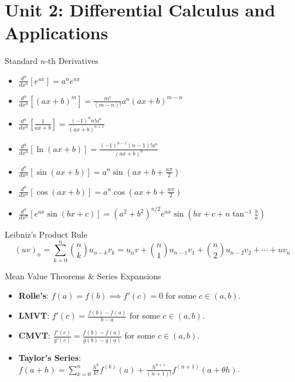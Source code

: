 \chapter{Unit 2: Differential Calculus and Applications}

\begin{formulabox}{Standard $n$-th Derivatives}
\begin{itemize}[leftmargin=1.5em]
    \item $\frac{d^n}{dx^n}[e^{ax}] = a^n e^{ax}$
    \item $\frac{d^n}{dx^n}[(ax+b)^m] = \frac{m!}{(m-n)!} a^n (ax+b)^{m-n}$
    \item $\frac{d^n}{dx^n}\left[\frac{1}{ax+b}\right] = \frac{(-1)^n n! a^n}{(ax+b)^{n+1}}$
    \item $\frac{d^n}{dx^n}[\ln(ax+b)] = \frac{(-1)^{n-1} (n-1)! a^n}{(ax+b)^n}$
    \item $\frac{d^n}{dx^n}[\sin(ax+b)] = a^n \sin\left(ax+b + \frac{n\pi}{2}\right)$
    \item $\frac{d^n}{dx^n}[\cos(ax+b)] = a^n \cos\left(ax+b + \frac{n\pi}{2}\right)$
    \item $\frac{d^n}{dx^n}[e^{ax}\sin(bx+c)] = (a^2+b^2)^{n/2} e^{ax}\sin\left(bx+c + n\tan^{-1}\frac{b}{a}\right)$
\end{itemize}
\end{formulabox}

\begin{formulabox}{Leibniz's Product Rule}
\begin{equation}
(uv)_n = \sum_{k=0}^n \binom{n}{k} u_{n-k} v_k = u_n v + \binom{n}{1} u_{n-1} v_1 + \binom{n}{2} u_{n-2} v_2 + \cdots + u v_n
\end{equation}
\end{formulabox}

\begin{formulabox}{Mean Value Theorems \& Series Expansions}
\begin{itemize}[leftmargin=1.5em]
    \item \textbf{Rolle's}: $f(a)=f(b) \implies f'(c) = 0$ for some $c \in (a,b)$.
    \item \textbf{LMVT}: $f'(c) = \frac{f(b)-f(a)}{b-a}$ for some $c \in (a,b)$.
    \item \textbf{CMVT}: $\frac{f'(c)}{g'(c)} = \frac{f(b)-f(a)}{g(b)-g(a)}$ for some $c \in (a,b)$.
    \item \textbf{Taylor's Series}: $f(a+h) = \sum_{k=0}^n \frac{h^k}{k!} f^{(k)}(a) + \frac{h^{n+1}}{(n+1)!} f^{(n+1)}(a+\theta h)$.
\end{itemize}
\end{formulabox}

